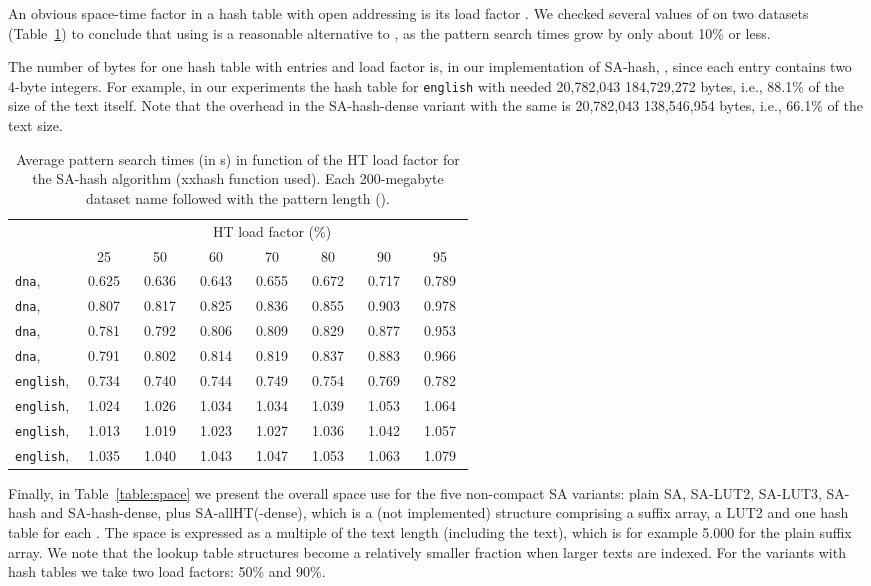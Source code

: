 \documentclass{cai}
\begin{document}
An obvious space-time factor in a hash table with open addressing 
is its load factor . 
We checked several values of  on two datasets 
(Table~\ref{table:HT_lf}) 
to conclude that using  
is a reasonable alternative 
to , as the pattern search times grow by only about 10\% or less.

The number of bytes for one hash table with  entries 
and  load factor is, 
in our implementation of SA-hash, , 
since each entry contains two 4-byte integers.
For example, in our experiments the hash table for \texttt{english} 
with 
needed 20,782,043  184,729,272 bytes, i.e.,  88.1\%
of the size of the text itself.
Note that the overhead in the SA-hash-dense variant with the same  
is 20,782,043  138,546,954 bytes, i.e.,  66.1\% 
of the text size.


\begin{table}
\centering
\begin{tabular}{lccccccc}
\hline
                    & \multicolumn{7}{c}{HT load factor (\%)}  \\
\cline{2-8}
     &~~25~~&~~50~~&~~60~~&~~70~~&~~80~~&~~90~~&~~95~~ \\
\hline
\texttt{dna},  & 0.625 & 0.636 & 0.643 & 0.655 & 0.672 & 0.717 & 0.789 \\
\texttt{dna},  & 0.807 & 0.817 & 0.825 & 0.836 & 0.855 & 0.903 & 0.978 \\
\texttt{dna},  & 0.781 & 0.792 & 0.806 & 0.809 & 0.829 & 0.877 & 0.953 \\
\texttt{dna},  & 0.791 & 0.802 & 0.814 & 0.819 & 0.837 & 0.883 & 0.966 \\
\texttt{english},  & 0.734 & 0.740 & 0.744 & 0.749 & 0.754 & 0.769 & 0.782 \\
\texttt{english},  & 1.024 & 1.026 & 1.034 & 1.034 & 1.039 & 1.053 & 1.064 \\
\texttt{english},  & 1.013 & 1.019 & 1.023 & 1.027 & 1.036 & 1.042 & 1.057 \\
\texttt{english},  & 1.035 & 1.040 & 1.043 & 1.047 & 1.053 & 1.063 & 1.079 \\
\hline
\end{tabular}
\vspace{4mm}
\caption{Average pattern search times (in s) in function of the HT load factor 
 for the SA-hash algorithm (xxhash function used). Each 200-megabyte  dataset name followed with the pattern length ().}
\label{table:HT_lf}
\end{table}


Finally, in Table~\ref{table:space} we present the overall space use 
for the five non-compact SA variants: 
plain SA, SA-LUT2, SA-LUT3, SA-hash and SA-hash-dense, plus SA-allHT(-dense), 
which is a (not implemented) structure comprising a suffix array, a LUT2 and 
one hash table for each .
The space is expressed as a multiple of the text length  (including the text), 
which is for example 5.000 for the plain suffix array.
We note that the lookup table structures become a relatively smaller fraction 
when larger texts are indexed.
For the variants with hash tables we take two load factors: 50\% and 90\%.
\end{document}
